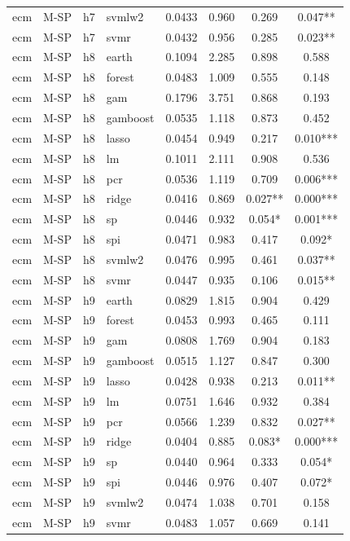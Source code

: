 \begin{ThreePartTable}
\begin{longtable}[t]{llclcccc}
ecm & M-SP & h7 & svmlw2 & 0.0433 & 0.960 & 0.269 & 0.047**\\
ecm & M-SP & h7 & svmr & 0.0432 & 0.956 & 0.285 & 0.023**\\
\addlinespace
ecm & M-SP & h8 & earth & 0.1094 & 2.285 & 0.898 & 0.588\\
ecm & M-SP & h8 & forest & 0.0483 & 1.009 & 0.555 & 0.148\\
ecm & M-SP & h8 & gam & 0.1796 & 3.751 & 0.868 & 0.193\\
ecm & M-SP & h8 & gamboost & 0.0535 & 1.118 & 0.873 & 0.452\\
ecm & M-SP & h8 & lasso & 0.0454 & 0.949 & 0.217 & 0.010***\\
ecm & M-SP & h8 & lm & 0.1011 & 2.111 & 0.908 & 0.536\\
ecm & M-SP & h8 & pcr & 0.0536 & 1.119 & 0.709 & 0.006***\\
ecm & M-SP & h8 & ridge & 0.0416 & 0.869 & 0.027** & 0.000***\\
ecm & M-SP & h8 & sp & 0.0446 & 0.932 & 0.054* & 0.001***\\
ecm & M-SP & h8 & spi & 0.0471 & 0.983 & 0.417 & 0.092*\\
ecm & M-SP & h8 & svmlw2 & 0.0476 & 0.995 & 0.461 & 0.037**\\
ecm & M-SP & h8 & svmr & 0.0447 & 0.935 & 0.106 & 0.015**\\
\addlinespace
ecm & M-SP & h9 & earth & 0.0829 & 1.815 & 0.904 & 0.429\\
ecm & M-SP & h9 & forest & 0.0453 & 0.993 & 0.465 & 0.111\\
ecm & M-SP & h9 & gam & 0.0808 & 1.769 & 0.904 & 0.183\\
ecm & M-SP & h9 & gamboost & 0.0515 & 1.127 & 0.847 & 0.300\\
ecm & M-SP & h9 & lasso & 0.0428 & 0.938 & 0.213 & 0.011**\\
ecm & M-SP & h9 & lm & 0.0751 & 1.646 & 0.932 & 0.384\\
ecm & M-SP & h9 & pcr & 0.0566 & 1.239 & 0.832 & 0.027**\\
ecm & M-SP & h9 & ridge & 0.0404 & 0.885 & 0.083* & 0.000***\\
ecm & M-SP & h9 & sp & 0.0440 & 0.964 & 0.333 & 0.054*\\
ecm & M-SP & h9 & spi & 0.0446 & 0.976 & 0.407 & 0.072*\\
ecm & M-SP & h9 & svmlw2 & 0.0474 & 1.038 & 0.701 & 0.158\\
ecm & M-SP & h9 & svmr & 0.0483 & 1.057 & 0.669 & 0.141\\

\end{longtable}
\end{ThreePartTable}
